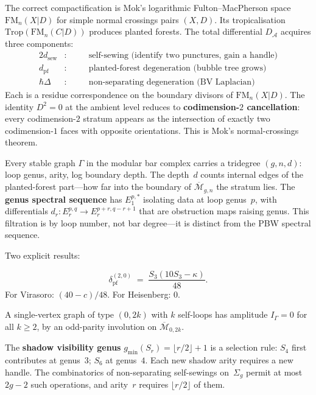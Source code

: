 \documentclass[11pt]{article}
\newcommand{\cA}{\mathcal{A}}
\newcommand{\cM}{\mathcal{M}}
\newcommand{\FM}{\mathrm{FM}}
\begin{document}
The correct compactification is Mok's logarithmic
Fulton--MacPherson space $\FM_n(X|D)$ for simple normal
crossings pairs $(X,D)$.  Its tropicalisation
$\mathrm{Trop}(\FM_n(C|D))$ produces planted forests.  The
total differential $D_\cA$ acquires three components:
\begin{alignat*}{2}
d_{\mathrm{sew}} &:\quad
  &&\text{self-sewing (identify two punctures, gain a handle)} \\
d_{\mathrm{pf}} &:\quad
  &&\text{planted-forest degeneration (bubble tree grows)} \\
\hbar\Delta &:\quad
  &&\text{non-separating degeneration (BV Laplacian)}
\end{alignat*}
Each is a residue correspondence on the boundary divisors of
$\FM_n(X|D)$.  The identity $D^2 = 0$ at the ambient level
reduces to \textbf{codimension-$2$ cancellation}: every
codimension-$2$ stratum appears as the intersection of exactly
two codimension-$1$ faces with opposite orientations.  This is
Mok's normal-crossings theorem.

\medskip

Every stable graph $\Gamma$ in the modular bar complex
carries a tridegree $(g, n, d)$: loop genus, arity, log
boundary depth.  The depth~$d$ counts internal edges of the
planted-forest part---how far into the boundary of
$\overline{\cM}_{g,n}$ the stratum lies.  The
\textbf{genus spectral sequence} has $E_1^{p,*}$ isolating
data at loop genus~$p$, with differentials
$d_r\colon E_r^{p,q} \to E_r^{p+r,q-r+1}$ that are
obstruction maps raising genus.  This filtration is by loop
number, not bar degree---it is distinct from the PBW spectral
sequence.

Two explicit results:

\begin{proposition}
\begin{equation}\label{eq:delta-pf-genus2}
\delta_{\mathrm{pf}}^{(2,0)}
\;=\; \frac{S_3(10 S_3 - \kappa)}{48}.
\end{equation}
For Virasoro: $(40-c)/48$.  For Heisenberg: $0$.
\end{proposition}

\begin{proposition}
A single-vertex graph of type $(0, 2k)$ with $k$ self-loops
has amplitude $I_\Gamma = 0$ for all $k \geq 2$, by an
odd-parity involution on $\overline{\cM}_{0,2k}$.
\end{proposition}

The \textbf{shadow visibility genus}
$g_{\min}(S_r) = \lfloor r/2 \rfloor + 1$ is a selection
rule: $S_4$ first contributes at genus~$3$; $S_6$ at genus~$4$.
Each new shadow arity requires a new handle.  The combinatorics
of non-separating self-sewings on~$\Sigma_g$ permit at most
$2g-2$ such operations, and arity~$r$ requires
$\lfloor r/2 \rfloor$ of them.
\end{document}
